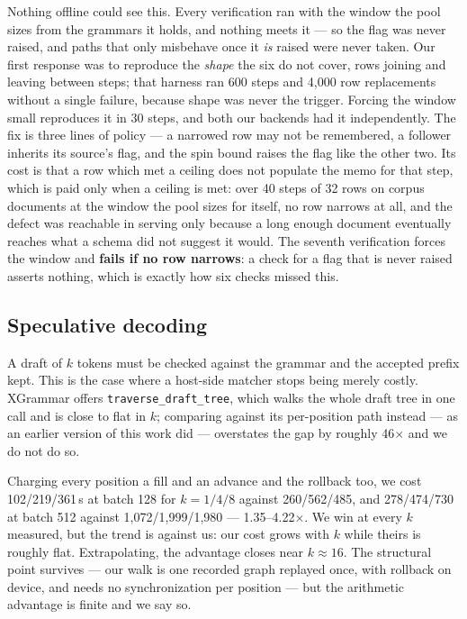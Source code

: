\documentclass{article}
\begin{document}
Nothing offline could see this. Every verification ran with the window the pool
sizes from the grammars it holds, and nothing meets it --- so the flag was never
raised, and paths that only misbehave once it \emph{is} raised were never
taken. Our first response was to reproduce the \emph{shape} the six do not
cover, rows joining and leaving between steps; that harness ran 600 steps and
4{,}000 row replacements without a single failure, because shape was never the
trigger. Forcing the window small reproduces it in 30 steps, and both our
backends had it independently. The fix is three lines of policy --- a narrowed
row may not be remembered, a follower inherits its source's flag, and the spin
bound raises the flag like the other two. Its cost is that a row which met a
ceiling does not populate the memo for that step, which is paid only when a
ceiling is met: over 40 steps of 32 rows on corpus documents at the window the
pool sizes for itself, no row narrows at all, and the defect was reachable in
serving only because a long enough document eventually reaches what a schema
did not suggest it would. The seventh
verification forces the window and \textbf{fails if no row narrows}: a check for
a flag that is never raised asserts nothing, which is exactly how six checks
missed this.

\subsection{Speculative decoding}
\label{sec:eval-spec}

A draft of $k$ tokens must be checked against the grammar and the accepted
prefix kept. This is the case where a host-side matcher stops being merely
costly. XGrammar offers \texttt{traverse\_draft\_tree}, which walks the whole
draft tree in one call and is close to flat in $k$; comparing against its
per-position path instead --- as an earlier version of this work did --- overstates
the gap by roughly 46$\times$ and we do not do so.

Charging every position a fill and an advance and the rollback too, we cost
102/219/361\,\textmu{}s at batch 128 for $k=1/4/8$ against 260/562/485, and
278/474/730 at batch 512 against 1{,}072/1{,}999/1{,}980 --- 1.35--4.22$\times$.
We win at every $k$ measured, but the trend is against us: our cost grows with
$k$ while theirs is roughly flat. Extrapolating,
the advantage closes near $k\approx16$. The structural point survives ---
our walk is one recorded graph replayed once, with rollback on device, and needs
no synchronization per position --- but the arithmetic advantage is finite and we
say so.
\end{document}
